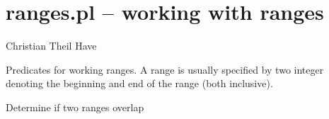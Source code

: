 


\section{ranges.pl -- working with ranges}

\label{sec:ranges}

\begin{tags}
Christian Theil Have
\end{tags}

Predicates for working ranges. A range is usually specified by two integer denoting the beginning and end
of the range (both inclusive).\vspace{0.7cm}

\begin{description}
Determine if two ranges overlap
\end{description}

